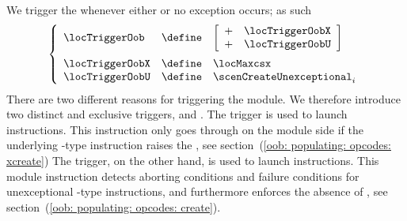 We trigger the \oobMod{} whenever either \maxcsxSH{} or no exception occurs; as such
\[
	\left\{ \begin{array}{lcl}
		\locTriggerOob  & \define & \left[ \begin{array}{cr}
			+ & \locTriggerOobX \\
			+ & \locTriggerOobU \\
		\end{array} \right]
		\vspace{2mm} \\
		\locTriggerOobX & \define & \locMaxcsx                                     \\
		\locTriggerOobU & \define & \scenCreateUnexceptional _{i}                  \\
	\end{array} \right.
\]
\saNote{}
There are two different reasons for triggering the \oobMod{} module.
We therefore introduce two distinct and exclusive \oobMod{} triggers,
\locTriggerOobX{} and
\locTriggerOobU{}.
The \locTriggerOobX{} trigger is used to launch \oobInstXcreate{} instructions.
This instruction only goes through on the \oobMod{} module side if the underlying -type instruction raises the \maxcsxSH{},
see section~(\ref{oob: populating: opcodes: xcreate})
The \locTriggerOobU{} trigger, on the other hand, is used to launch \oobInstCreate{} instructions.
This \oobMod{} module instruction detects aborting conditions and failure conditions for unexceptional -type instructions,
and furthermore enforces the absence of \maxcsxSH{},
see section~(\ref{oob: populating: opcodes: create}).

